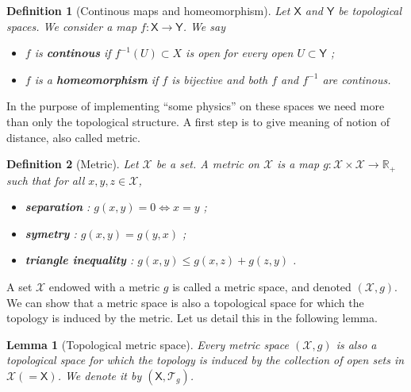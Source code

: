 \documentclass[10pt]{book}
\newcommand{\Tcal}{\mathcal{T}}
\newcommand{\Xcal}{\mathcal{X}}
\newcommand{\Rbb}{\mathbb{R}}
\newcommand{\Xsf}{\mathsf{X}}
\newcommand{\Ysf}{\mathsf{Y}}
\theoremstyle{break}
\newtheorem{lemma}{Lemma}
\newtheorem{definition}{Definition}
\begin{document}
\begin{definition}[Continous maps and homeomorphism]
Let $\Xsf$ and $\Ysf$ be topological spaces. We consider a map $f : \Xsf \to \Ysf$. We say
%
\begin{itemize}
\vspace*{-4pt}
\setlength{\itemsep}{-1pt}
\item $f$ is \textbf{continous} if $f^{-1}(U) \subset X$ is open for every open $U \subset\Ysf$ ;
\item $f$ is a \textbf{homeomorphism} if $f$ is bijective and both $f$ and $f^{-1}$ are continous.
\end{itemize}
%
\end{definition}


In the purpose of implementing ``some physics'' on these spaces we need more than only the topological structure. A first step is to give meaning of notion of distance, also called metric.


\begin{definition}[Metric]
Let $\Xcal$ be a set. A metric on $\Xcal$ is a map $g : \Xcal \times \Xcal \to \Rbb_+$ such that for all $x, y, z \in \Xcal$,%
%
\begin{itemize}
\vspace*{-4pt}
\setlength{\itemsep}{-1pt}
\item \textbf{separation} : $g(x,y) = 0 \Leftrightarrow x=y$ ; 
\item \textbf{symetry} : $g(x,y) = g(y,x)$ ;
\item \textbf{triangle inequality} : $g(x,y) \leq g(x,z) + g(z,y)$ .
\end{itemize}
%
\end{definition}


A set $\Xcal$ endowed with a metric $g$ is called a metric space, and denoted $(\Xcal,g)$. We can show that a metric space is also a topological space for which the topology is induced by the metric. Let us detail this in the following lemma.


\begin{lemma}[Topological metric space]
Every metric space $(\Xcal,g)$ is also a topological space for which the topology is induced by the collection of open sets in $\Xcal(=\Xsf)$. We denote it by $(\Xsf,\Tcal_g)$.
\end{lemma}
\end{document}
